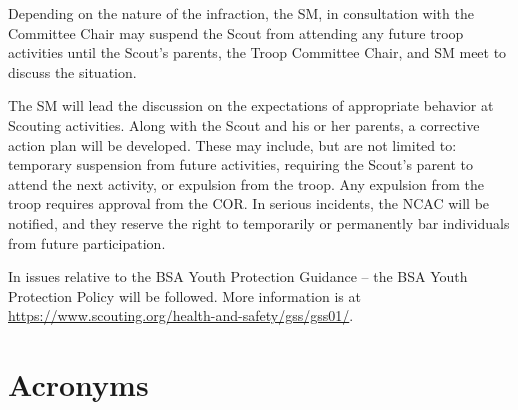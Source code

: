 \documentclass{ltxguide}
\begin{document}
Depending on the nature of the infraction, the \ac{SM}, in consultation with the Committee Chair may suspend the Scout from attending any future troop activities until the Scout's parents, the Troop Committee Chair, and \ac{SM} meet to discuss the situation.

The \ac{SM} will lead the discussion on the expectations of appropriate behavior     at Scouting activities. Along with the Scout and his or her parents, a corrective action plan will be developed. These may include, but are not limited to: temporary suspension from future activities, requiring the Scout's parent to attend the next activity, or expulsion from the troop. Any expulsion from the troop requires approval from the \ac{COR}. In serious incidents, the \ac{NCAC} will be notified, and they reserve the right to temporarily or permanently bar individuals from future participation.

In issues relative to the \ac{BSA} Youth Protection Guidance – the \ac{BSA} Youth Protection Policy will be followed. More information is at \url{https://www.scouting.org/health-and-safety/gss/gss01/}.



\section{Acronyms}
\begin{acronym}[XXXXXXX]
\end{acronym}
\end{document}
